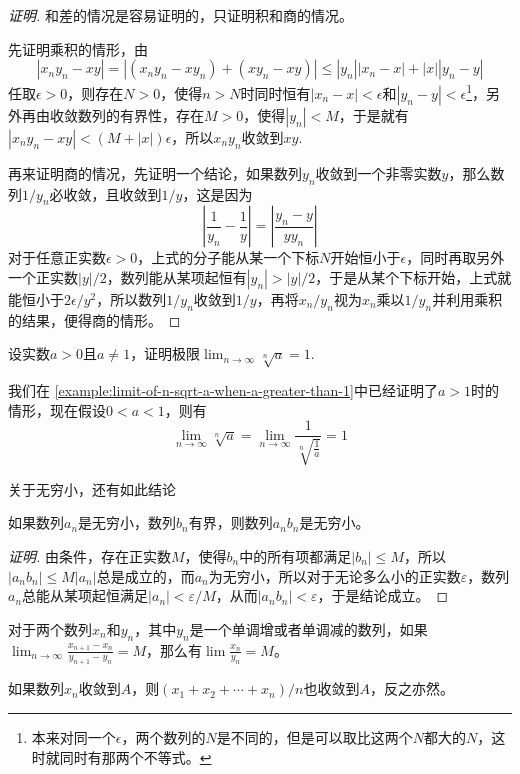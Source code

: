 \begin{proof}[证明]
  和差的情况是容易证明的，只证明积和商的情况。

  先证明乘积的情形，由
  \begin{equation*}
    |x_ny_n-xy| = |(x_ny_n-xy_n) + (xy_n-xy)| \leqslant |y_n||x_n-x| + |x| |y_n-y|
  \end{equation*}
  任取$\epsilon > 0$，则存在$N>0$，使得$n>N$时同时恒有$|x_n-x|<\epsilon$和$|y_n-y|<\epsilon$\footnote{本来对同一个$\epsilon$，两个数列的$N$是不同的，但是可以取比这两个$N$都大的$N$，这时就同时有那两个不等式。}，另外再由收敛数列的有界性，存在$M>0$，使得$ |y_n| < M$，于是就有 $|x_ny_n-xy| < (M+|x|)\epsilon$，所以$x_ny_n$收敛到$xy.$

  再来证明商的情况，先证明一个结论，如果数列$y_n$收敛到一个非零实数$y$，那么数列$1/y_n$必收敛，且收敛到$1/y$，这是因为
  \begin{equation*}
    \left| \frac{1}{y_n} - \frac{1}{y} \right| = \left| \frac{y_n-y}{yy_n} \right|
  \end{equation*}
  对于任意正实数$\epsilon>0$，上式的分子能从某一个下标$N$开始恒小于$\epsilon$，同时再取另外一个正实数$|y|/2$，数列能从某项起恒有$|y_n|>|y|/2$，于是从某个下标开始，上式就能恒小于$2\epsilon / y^2$，所以数列$1/y_n$收敛到$1/y$，再将$x_n/y_n$视为$x_n$乘以$1/y_n$并利用乘积的结果，便得商的情形。
\end{proof}

\begin{example}
  \label{example:limit-of-n-sqrt-a}
  设实数$a>0$且$a \neq 1$，证明极限$\lim_{n \to \infty} \sqrt[n]{a} = 1$.

  我们在 \autoref{example:limit-of-n-sqrt-a-when-a-greater-than-1}中已经证明了$a>1$时的情形，现在假设$0<a<1$，则有
  \[ \lim_{n \to \infty} \sqrt[n]{a} = \lim_{n \to \infty} \frac{1}{\sqrt[n]{\frac{1}{a}}} = 1 \]
\end{example}

关于无穷小，还有如此结论
\begin{theorem}
  如果数列$a_n$是无穷小，数列$b_n$有界，则数列$a_nb_n$是无穷小。
\end{theorem}

\begin{proof}[证明]
  由条件，存在正实数$M$，使得$b_n$中的所有项都满足$|b_n|\leqslant M$，所以$|a_nb_n| \leqslant M |a_n|$总是成立的，而$a_n$为无穷小，所以对于无论多么小的正实数$\varepsilon$，数列$a_n$总能从某项起恒满足$|a_n|<\varepsilon/M$，从而$|a_nb_n|<\varepsilon$，于是结论成立。
\end{proof}

\begin{theorem}[Stolz 定理]
  对于两个数列$x_n$和$y_n$，其中$y_n$是一个单调增或者单调减的数列，如果$\lim_{n\to\infty}\frac{x_{n+1}-x_n}{y_{n+1}-y_n} = M$，那么有$\lim \frac{x_n}{y_n} = M$。
\end{theorem}

\begin{inference}
  如果数列$x_n$收敛到$A$，则$(x_1+x_2+\cdots+x_n)/n$也收敛到$A$，反之亦然。
\end{inference}

